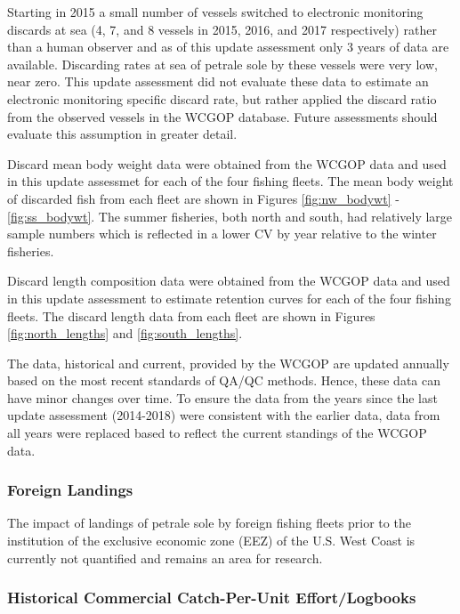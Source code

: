 \documentclass[12pt,]{article}
\begin{document}
Starting in 2015 a small number of vessels switched to electronic
monitoring discards at sea (4, 7, and 8 vessels in 2015, 2016, and 2017
respectively) rather than a human observer and as of this update
assessment only 3 years of data are available. Discarding rates at sea
of petrale sole by these vessels were very low, near zero. This update
assessment did not evaluate these data to estimate an electronic
monitoring specific discard rate, but rather applied the discard ratio
from the observed vessels in the WCGOP database. Future assessments
should evaluate this assumption in greater detail.

Discard mean body weight data were obtained from the WCGOP data and used
in this update assessmet for each of the four fishing fleets. The mean
body weight of discarded fish from each fleet are shown in Figures
\ref{fig:nw_bodywt} - \ref{fig:ss_bodywt}. The summer fisheries, both
north and south, had relatively large sample numbers which is reflected
in a lower CV by year relative to the winter fisheries.

Discard length composition data were obtained from the WCGOP data and
used in this update assessment to estimate retention curves for each of
the four fishing fleets. The discard length data from each fleet are
shown in Figures \ref{fig:north_lengths} and \ref{fig:south_lengths}.

The data, historical and current, provided by the WCGOP are updated
annually based on the most recent standards of QA/QC methods. Hence,
these data can have minor changes over time. To ensure the data from the
years since the last update assessment (2014-2018) were consistent with
the earlier data, data from all years were replaced based to reflect the
current standings of the WCGOP data.

\subsubsection{Foreign Landings}\label{foreign-landings}

The impact of landings of petrale sole by foreign fishing fleets prior
to the institution of the exclusive economic zone (EEZ) of the U.S. West
Coast is currently not quantified and remains an area for research.

\subsubsection{Historical Commercial Catch-Per-Unit
Effort/Logbooks}\label{historical-commercial-catch-per-unit-effortlogbooks}
\end{document}

